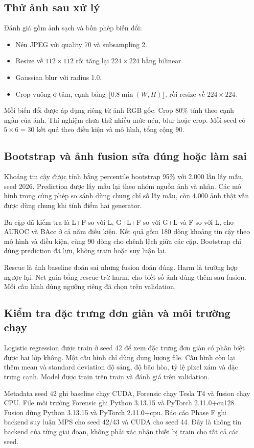 \subsection{Thử ảnh sau xử lý}
Đánh giá gồm ảnh sạch và bốn phép biến đổi:
\begin{itemize}[nosep]
\item Nén JPEG với quality 70 và subsampling 2.
\item Resize về $112\times112$ rồi tăng lại $224\times224$ bằng bilinear.
\item Gaussian blur với radius 1.0.
\item Crop vuông ở tâm, cạnh bằng $\lfloor0.8\min(W,H)\rfloor$, rồi resize về $224\times224$.
\end{itemize}
Mỗi biến đổi được áp dụng riêng từ ảnh RGB gốc. Crop 80\% tính theo cạnh ngắn của ảnh. Thí nghiệm chưa thử nhiều mức nén, blur hoặc crop. Mỗi seed có $5\times6=30$ kết quả theo điều kiện và mô hình, tổng cộng 90.

\subsection{Bootstrap và ảnh fusion sửa đúng hoặc làm sai}
Khoảng tin cậy được tính bằng percentile bootstrap 95\% với 2.000 lần lấy mẫu, seed 2026. Prediction được lấy mẫu lại theo nhóm nguồn ảnh và nhãn. Các mô hình trong cùng phép so sánh dùng chung chỉ số lấy mẫu, còn 4.000 ảnh thật vẫn được dùng chung khi tính điểm hai generator.

Ba cặp đã kiểm tra là L+F so với L, G+L+F so với G+L và F so với L, cho AUROC và BAcc ở cả năm điều kiện. Kết quả gồm 180 dòng khoảng tin cậy theo mô hình và điều kiện, cùng 90 dòng cho chênh lệch giữa các cặp. Bootstrap chỉ dùng prediction đã lưu, không train hoặc suy luận lại.

Rescue là ảnh baseline đoán sai nhưng fusion đoán đúng. Harm là trường hợp ngược lại. Net gain bằng rescue trừ harm, cho biết số ảnh đúng thêm sau fusion. Mỗi cấu hình dùng ngưỡng riêng đã chọn trên validation.

\subsection{Kiểm tra đặc trưng đơn giản và môi trường chạy}
Logistic regression được train ở seed 42 để xem đặc trưng đơn giản có phân biệt được hai lớp không. Một cấu hình chỉ dùng dung lượng file. Cấu hình còn lại thêm mean và standard deviation độ sáng, độ bão hòa, tỷ lệ pixel xám và đặc trưng cạnh. Model được train trên train và đánh giá trên validation.

Metadata seed 42 ghi baseline chạy CUDA, Forensic chạy Tesla T4 và fusion chạy CPU. File môi trường Forensic ghi Python 3.13.15 và PyTorch 2.11.0+cu128. Fusion dùng Python 3.13.15 và PyTorch 2.11.0+cpu. Báo cáo Phase F ghi backend suy luận MPS cho seed 42/43 và CUDA cho seed 44. Đây là thông tin backend của từng giai đoạn, không phải xác nhận thiết bị train cho tất cả các seed.
